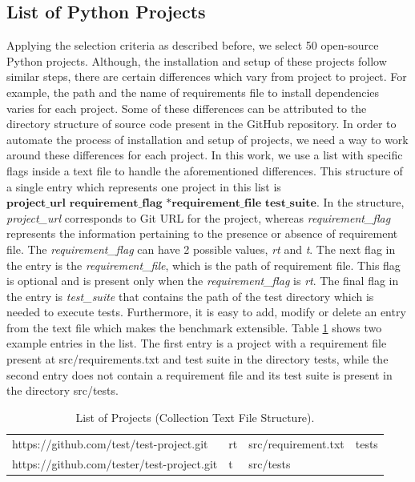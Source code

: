 \subsection{List of Python Projects}
\label{approach:list of projects}
Applying the selection criteria as described before, we select 50 open-source Python projects.
Although, the installation and setup of these projects follow similar steps, there are certain differences which vary from project to project.
For example, the path and the name of requirements file to install dependencies varies for each project.
Some of these differences can be attributed to the directory structure of source code present in the GitHub repository.
In order to automate the process of installation and setup of projects, we need a way to work around these differences for each project.
In this work, we use a list with specific flags inside a text file to handle the aforementioned differences.
This structure of a single entry  which represents one project in this list is $ \textbf{project\_url requirement\_flag *requirement\_file test\_suite} $.
In the structure, \textit{project\_url} corresponds to Git URL for the project, whereas \textit{requirement\_flag} represents the information pertaining to the presence or absence of requirement file.
The \textit{requirement\_flag} can have 2 possible values, \textit{rt} and \textit{t}.
The next flag in the entry is the \textit{requirement\_file}, which is the path of requirement file. 
This flag is optional and is present only when the \textit{requirement\_flag} is \textit{rt}.
The final flag in the entry is \textit{test\_suite} that contains the path of the test directory which is needed to execute tests.
Furthermore, it is easy to add, modify or delete an entry from the text file which makes the benchmark extensible.
Table \ref{table:list of projects} shows two example entries in the list.
The first entry is a project with a requirement file present at src/requirements.txt and test suite in the directory tests, while the second entry does not contain a requirement file and its test suite is present in the directory src/tests.

\begin{table}[ht]
    \centering
    \begin{tabular}{llll}
    \hline
    https://github.com/test/test-project.git & rt & src/requirement.txt & tests\\
    https://github.com/tester/test-project.git & t & src/tests\\
    \hline
    \end{tabular}
    \caption{List of Projects (Collection Text File Structure).}
    \label{table:list of projects}
\end{table}

